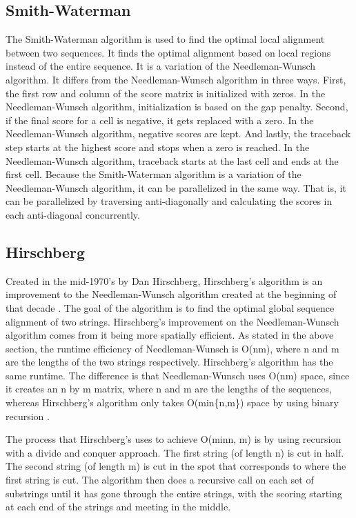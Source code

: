 \documentclass[conference]{IEEEtran}
\begin{document}
\subsection{Smith-Waterman}
The Smith-Waterman algorithm is used to find the optimal local alignment between two sequences. It finds the optimal alignment based on local regions instead of the entire sequence. It is a variation of the Needleman-Wunsch algorithm. It differs from the Needleman-Wunsch algorithm in three ways. First, the first row and column of the score matrix is initialized with zeros. In the Needleman-Wunsch algorithm, initialization is based on the gap penalty. Second, if the final score for a cell is negative, it gets replaced with a zero. In the Needleman-Wunsch algorithm, negative scores are kept. And lastly, the traceback step starts at the highest score and stops when a zero is reached. In the Needleman-Wunsch algorithm, traceback starts at the last cell and ends at the first cell. Because the Smith-Waterman algorithm is a variation of the Needleman-Wunsch algorithm, it can be parallelized in the same way. That is, it can be parallelized by traversing anti-diagonally and calculating the scores in each anti-diagonal concurrently.

\subsection{Hirschberg}
Created in the mid-1970’s by Dan Hirschberg, Hirschberg’s algorithm is an improvement to the Needleman-Wunsch algorithm created at the beginning of that decade \cite{hirschberg_1975}. The goal of the algorithm is to find the optimal global sequence alignment of two strings. Hirschberg’s improvement on the Needleman-Wunsch algorithm comes from it being more spatially efficient. As stated in the above section, the runtime efficiency of Needleman-Wunsch is O(nm), where n and m are the lengths of the two strings respectively. Hirschberg’s algorithm has the same runtime. The difference is that Needleman-Wunsch uses O(nm) space, since it creates an n by m matrix, where n and m are the lengths of the sequences, whereas Hirschberg’s algorithm only takes O(min\{n,m\}) space by using binary recursion \cite{edit_distance_revisited}.

The process that Hirschberg’s uses to achieve O(min{n, m}) is by using recursion with a divide and conquer approach. The first string (of length n) is cut in half. The second string (of length m) is cut in the spot that corresponds to where the first string is cut. The algorithm then does a recursive call on each set of substrings until it has gone through the entire strings, with the scoring starting at each end of the strings and meeting in the middle.
\end{document}
